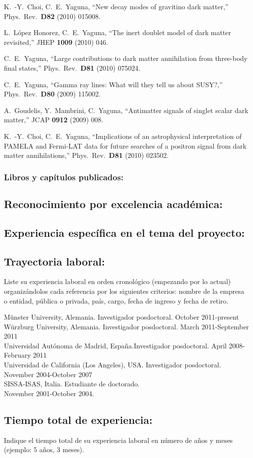  K.~-Y.~Choi, C.~E.~Yaguna,
  ``New decay modes of gravitino dark matter,''
  Phys.\ Rev.\  {\bf D82 } (2010)  015008.

  L.~López Honorez, C.~E.~Yaguna,
  ``The inert doublet model of dark matter revisited,''
  JHEP {\bf 1009 } (2010)  046.

  C.~E.~Yaguna,
  ``Large contributions to dark matter annihilation from three-body final states,''
  Phys.\ Rev.\  {\bf D81 } (2010)  075024.

  C.~E.~Yaguna,
  ``Gamma ray lines: What will they tell us about SUSY?,''
  Phys.\ Rev.\  {\bf D80 } (2009)  115002.

  A.~Goudelis, Y.~Mambrini, C.~Yaguna,
  ``Antimatter signals of singlet scalar dark matter,''
  JCAP {\bf 0912 } (2009)  008.

  K.~-Y.~Choi, C.~E.~Yaguna,
  ``Implications of an astrophysical interpretation of PAMELA and Fermi-LAT data for future searches of a positron signal from dark matter annihilations,''
  Phys.\ Rev.\  {\bf D81 } (2010)  023502.
\subsubsection{Libros y capítulos publicados:}
\subsection{Reconocimiento por excelencia académica:}
\subsection{Experiencia específica en el tema del proyecto:}
\subsection{Trayectoria laboral:}
\begin{instrucciones}
  Liste su experiencia laboral en orden cronológico (empezando por lo
  actual) organizándolos cada referencia por los siguientes criterios:
  nombre de la empresa o entidad, pública o privada, país, cargo,
  fecha de ingreso y fecha de retiro.
\end{instrucciones}
M\"unster University, Alemania. Investigador posdoctoral. October 2011-present\\
W\"urzburg University, Alemania. Investigador posdoctoral. March 2011-September 2011\\
Universidad Autónoma de Madrid, España.Investigador posdoctoral. April 2008-February 2011\\
Universidad de California (Los Angeles), USA. Investigador posdoctoral. November 2004-October 2007\\
SISSA-ISAS, Italia. Estudiante de doctorado.\\ November 2001-October 2004.\\
\subsection{Tiempo total de experiencia:}
\begin{instrucciones}
  Indique el tiempo total de su experiencia laboral en número de años
  y meses (ejemplo: 5 años, 3 meses).
\end{instrucciones}


